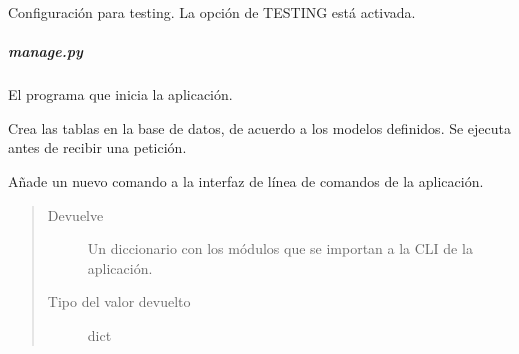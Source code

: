 

\begin{fulllineitems}
\label{\detokenize{chapter_two/desc_cloudnao:config.TestingConfig}}
Configuración para testing. La opción de TESTING está activada.

\end{fulllineitems}



\subparagraph{manage.py}
\label{\detokenize{chapter_two/desc_cloudnao:module-manage}}\label{\detokenize{chapter_two/desc_cloudnao:manage-py}}
El programa que inicia la aplicación.

\begin{fulllineitems}
\label{\detokenize{chapter_two/desc_cloudnao:manage.create_tables}}
Crea las tablas en la base de datos, de acuerdo a los modelos
definidos. Se ejecuta antes de recibir una petición.

\end{fulllineitems}


\begin{fulllineitems}
\label{\detokenize{chapter_two/desc_cloudnao:manage.make_shell_context}}
Añade un nuevo comando a la interfaz de línea de comandos
de la aplicación.
\begin{quote}\begin{description}
\item[{Devuelve}] \leavevmode
Un diccionario con los módulos que se importan a la CLI de la aplicación.

\item[{Tipo del valor devuelto}] \leavevmode
dict

\end{description}\end{quote}

\end{fulllineitems}

